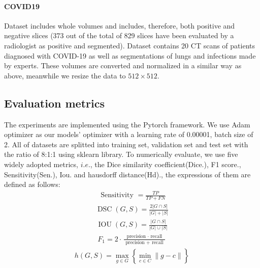 \documentclass{ieeeaccess}
\begin{document}
  
  \paragraph{COVID19}
  Dataset\cite{covid19} includes whole volumes and includes, therefore, both positive and negative slices 
  (373 out of the total of 829 slices have been evaluated by a radiologist as positive and segmented). 
  Dataset\cite{covid19_2} contains 20 CT scans of patients diagnosed with COVID-19 as well as segmentations of lungs and infections made by experts.
  These volumes are converted and normalized in a similar way as above, meanwhile we resize the data to $512\times 512$.
  
  \subsection{Evaluation metrics}
  The experiments are implemented using the Pytorch framework. We use Adam optimizer\cite{Adam} as our
  models' optimizer with a learning rate of 0.00001, batch size of 2. All of datasets are splitted into training set, validation set and test set with 
  the ratio of 8:1:1 using sklearn library. To numerically evaluate, we use five widely adopted metrics, \(i.e.\),
  the Dice similarity coefficient(Dice.), F1 score., Sensitivity(Sen.), Iou. and hausdorff distance(Hd)., the expressions of them are defined as follows:
  \begin{align}
    \text { Sensitivity }=\frac{T P}{T P+F N}
  \end{align}
  \begin{align}
    \operatorname{DSC}(G, S)=\frac{2|G \cap S|}{|G|+|S|}
  \end{align}
  \begin{align}
    \operatorname{IOU}(G, S)=\frac{|G \cap S|}{|G| \cup|S|}
  \end{align}
  \begin{align}
    F_{1}=2 \cdot \frac{\text { precision } \cdot \text { recall }}{\text { precision }+\text { recall }}
  \end{align}
  \begin{align}
    h(G, S)=\max _{g \in G}\left\{\min _{c \in C}\|g-c\|\right\}
  \end{align}
\end{document}
